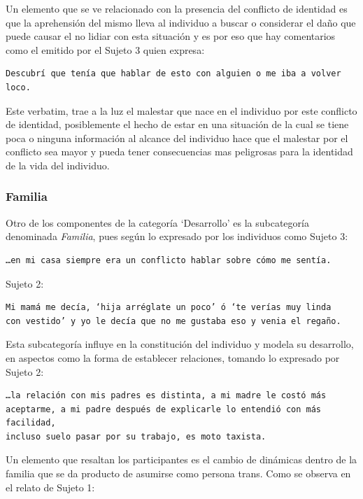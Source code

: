  Un elemento que se ve relacionado con la presencia del conflicto de identidad
 es que la aprehensión del mismo lleva al individuo a buscar o considerar el
 daño que puede causar el no lidiar con esta situación y es por eso que hay
 comentarios como el emitido por el Sujeto 3 quien expresa:

 \begin{verbatim}
Descubrí que tenía que hablar de esto con alguien o me iba a volver loco.
 \end{verbatim}

 Este verbatim, trae a la luz el malestar que nace en el individuo por este
 conflicto de identidad, posiblemente el hecho de estar en una situación de la
 cual se tiene poca o ninguna información al alcance del individuo hace que el
 malestar por el conflicto sea mayor y pueda tener consecuencias mas peligrosas
 para la identidad de la vida del individuo.

\subsubsection{Familia}

Otro de los componentes de la categoría ‘Desarrollo’ es la subcategoría
denominada \emph{Familia}, pues según  lo expresado por los individuos como
Sujeto 3:

\begin{verbatim}
…en mi casa siempre era un conflicto hablar sobre cómo me sentía.
\end{verbatim}

Sujeto 2:

\begin{verbatim}
Mi mamá me decía, ‘hija arréglate un poco’ ó ‘te verías muy linda
con vestido’ y yo le decía que no me gustaba eso y venia el regaño.
\end{verbatim}

Esta subcategoría influye en la constitución del individuo y modela su
desarrollo, en aspectos como la forma de establecer relaciones,
tomando lo expresado por Sujeto 2:

\begin{verbatim}
…la relación con mis padres es distinta, a mi madre le costó más
aceptarme, a mi padre después de explicarle lo entendió con más facilidad,
incluso suelo pasar por su trabajo, es moto taxista.
\end{verbatim}

Un elemento que resaltan los participantes es el cambio de dinámicas dentro de
la familia que se da producto de asumirse como persona trans. Como se observa en
el relato de Sujeto 1:

